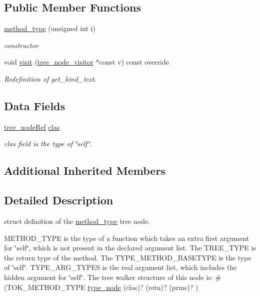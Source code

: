 \subsection*{Public Member Functions}
\begin{DoxyCompactItemize}
\item 
\hyperlink{structmethod__type_a9db4c615cbce337c1047f702756b202d}{method\+\_\+type} (unsigned int i)
\begin{DoxyCompactList}\small\item\em constructor \end{DoxyCompactList}\item 
void \hyperlink{structmethod__type_a5994c05dca057b061c979293c5895c41}{visit} (\hyperlink{classtree__node__visitor}{tree\+\_\+node\+\_\+visitor} $\ast$const v) const override
\begin{DoxyCompactList}\small\item\em Redefinition of get\+\_\+kind\+\_\+text. \end{DoxyCompactList}\end{DoxyCompactItemize}
\subsection*{Data Fields}
\begin{DoxyCompactItemize}
\item 
\hyperlink{tree__node_8hpp_a6ee377554d1c4871ad66a337eaa67fd5}{tree\+\_\+node\+Ref} \hyperlink{structmethod__type_a16b6784e001004d31e31495445c93b86}{clas}
\begin{DoxyCompactList}\small\item\em clas field is the type of \char`\"{}self\char`\"{}. \end{DoxyCompactList}\end{DoxyCompactItemize}
\subsection*{Additional Inherited Members}


\subsection{Detailed Description}
struct definition of the \hyperlink{structmethod__type}{method\+\_\+type} tree node. 

M\+E\+T\+H\+O\+D\+\_\+\+T\+Y\+PE is the type of a function which takes an extra first argument for \char`\"{}self\char`\"{}, which is not present in the declared argument list. The T\+R\+E\+E\+\_\+\+T\+Y\+PE is the return type of the method. The T\+Y\+P\+E\+\_\+\+M\+E\+T\+H\+O\+D\+\_\+\+B\+A\+S\+E\+T\+Y\+PE is the type of \char`\"{}self\char`\"{}. T\+Y\+P\+E\+\_\+\+A\+R\+G\+\_\+\+T\+Y\+P\+ES is the real argument list, which includes the hidden argument for \char`\"{}self\char`\"{}. The tree walker structure of this node is\+: \#(T\+O\+K\+\_\+\+M\+E\+T\+H\+O\+D\+\_\+\+T\+Y\+PE \hyperlink{structtype__node}{type\+\_\+node} (clas)? (retn)? (prms)? ) 

